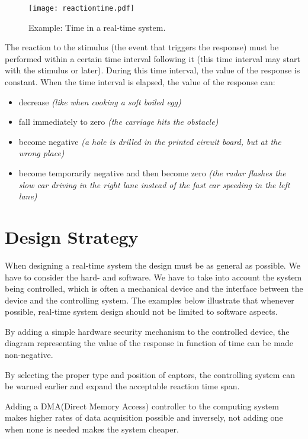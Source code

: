 \documentclass[../main.tex]{subfiles}
\begin{document}
\begin{figure}[H]
    \centering
    \texttt{[image: reactiontime.pdf]}
    \caption{Example: Time in a real-time system. \label{fig:reactiontime}}
    \label{rttime}
\end{figure}
The reaction to the stimulus (the event that triggers the response) must be performed within a certain time interval following it (this time interval may start with the stimulus or later). During this time interval, the value of the response is constant. When the time interval is elapsed, the value of the response can:
\begin{itemize}
	\item decrease \textit{(like when cooking a soft boiled egg)}
	\item fall immediately to zero \textit{(the carriage hits the obstacle)}
	\item become negative \textit{(a hole is drilled in the printed circuit board, but at the wrong place)}
	\item become temporarily negative and then become zero\textit{ (the radar flashes the slow car driving in the right lane instead of the fast car speeding in the left lane)}
\end{itemize}

\section{Design Strategy}
When designing a real-time system the design must be as general as possible. We have to consider the hard- and software. We have to take into account the system being controlled, which is often a mechanical device and the interface between the device and the controlling system. The examples below illustrate that whenever possible, real-time system design should not be limited to software aspects.

\begin{exmp}
By adding a simple hardware security mechanism to the controlled device, the diagram representing the value of the response in function of time can be made non-negative.
\end{exmp}

\begin{exmp}
By selecting the proper type and position of captors, the controlling system can be warned earlier and expand the acceptable reaction time span.
\end{exmp}

\begin{exmp}
Adding a DMA(Direct Memory Access) controller to the computing system makes higher rates of data acquisition possible and inversely, not adding one when none is needed makes the system cheaper.
\end{exmp}
\end{document}
